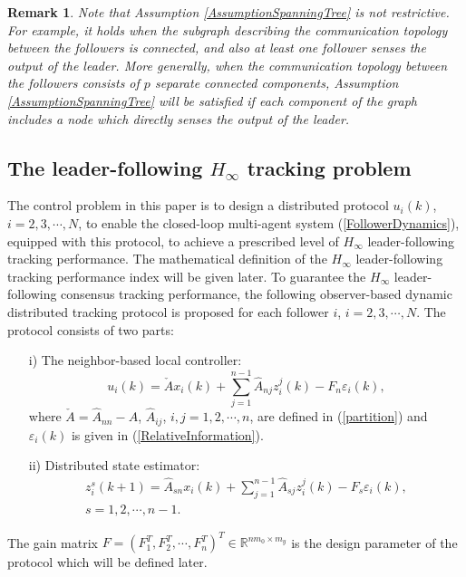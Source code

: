 \documentclass[a4paper,10pt,onecolumn]{article}
\newtheorem{remark}{Remark}
\begin{document}
\begin{remark}
Note that Assumption \ref{AssumptionSpanningTree} is not restrictive. For
example, it holds when the subgraph describing the communication topology
between the followers is connected, and also at least one follower
senses the output of the leader. More generally, when the communication
topology between the followers consists of $p$ separate connected
components, Assumption \ref{AssumptionSpanningTree} will be satisfied if
each component of the graph includes a node which
directly senses the output of the leader.
\end{remark}


\subsection{The leader-following $H_\infty$ tracking problem}

The control problem in this paper is to design a distributed protocol
$u_{i}(k)$, $i=2,3,\cdots,N$, to enable the closed-loop multi-agent
system (\ref{FollowerDynamics}), equipped with this protocol, to
achieve a prescribed level of $H_{\infty}$ leader-following tracking
performance. The mathematical definition of the $H_{\infty}$ leader-following tracking
performance index will be given later. To guarantee the $H_{\infty}$ leader-following consensus
tracking performance, the following observer-based dynamic distributed
tracking protocol is proposed for each follower $i$, $i=2,3,\cdots,N$. The
protocol consists of two parts: 
 \begin{itemize}
\item [i)] The neighbor-based local controller:
\begin{equation}\label{LocalController}
u_{i}(k)=\check{A}x_{i}(k)
+\sum_{j=1}^{n-1}\hat{A}_{nj}z_{i}^{j}(k)-F_{n}\varepsilon_{i}(k),
\end{equation}
where $\check{A}=\hat{A}_{nn}-A$,  $\hat{A}_{ij}$, $i,j=1,2,\cdots,n$, are defined in (\ref{partition}) and $\varepsilon_{i}(k)$
is given in (\ref{RelativeInformation}).

\item [ii)] Distributed state estimator:
\begin{eqnarray}\label{DistributedEstimator}
z_{i}^{s}(k+1)=\hat{A}_{sn}x_{i}(k)+\sum_{j=1}^{n-1}\hat{A}_{sj}z_{i}^{j}(k)-
F_{s}\varepsilon_{i}(k), \\
s=1,2,\cdots,n-1. \nonumber
\end{eqnarray}
 \end{itemize}
The gain matrix $F=(F_{1}^{T},F_{2}^{T},\cdots,F_{n}^{T})^{T}\in
\mathbb{R}^{nm_{0}\times m_{y}}$ is the design parameter of the protocol
which will be defined later. 
\end{document}
